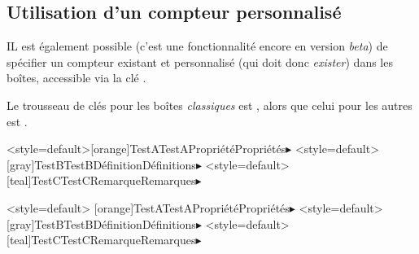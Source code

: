 \documentclass[french,11pt,a4paper]{article}
\begin{document}
\subsection{Utilisation d'un compteur personnalisé}

IL est également possible (c'est une fonctionnalité encore en version \textit{beta}) de spécifier un \textsf{compteur} existant et personnalisé (qui doit donc \textit{exister}) dans les boîtes, accessible via la clé \MontreCode{[CompteurPerso=...]}.

\smallskip

Le trousseau de clés pour les boîtes \textit{classiques} est \MontreCode{[Boites]}, alors que celui pour les autres est \MontreCode{[cpaltboites]}.

\GenereBoite<style=default>[orange]{TestA}{TestA}{Propriété}{Propriétés}{$\blacktriangleright$}
\GenereBoite<style=default>[gray]{TestB}{TestB}{Définition}{Définitions}{$\blacktriangleright$}
\GenereBoite<style=default>[teal]{TestC}{TestC}{Remarque}{Remarques}{$\blacktriangleright$}

\begin{codehigh}[language=latex/latex2,style/main=cyan!10,style/code=cyan!10]
\GenereBoite<style=default>%
  [orange]{TestA}{TestA}{Propriété}{Propriétés}{$\blacktriangleright$}
\GenereBoite<style=default>%
  [gray]{TestB}{TestB}{Définition}{Définitions}{$\blacktriangleright$}
\GenereBoite<style=default>%
  [teal]{TestC}{TestC}{Remarque}{Remarques}{$\blacktriangleright$}
\end{codehigh}

\begin{demohigh}[language=latex/latex2,style/main=cyan!10,style/code=cyan!10]
\begin{TestA}
\lipsum[1][3-4]
\end{TestA}
\begin{TestB}
\lipsum[2][3-4]
\end{TestB}
\begin{TestC}
\lipsum[2][3-4]
\end{TestC}
\begin{TestB}
\lipsum[2][3-4]
\end{TestB}
\begin{TestC}[Pluriel,Logo={example-image-1x1},SousTitre={ - Fondamentales -}]
\lipsum[3][1-7]
\end{TestC}
\end{demohigh}
\end{document}
